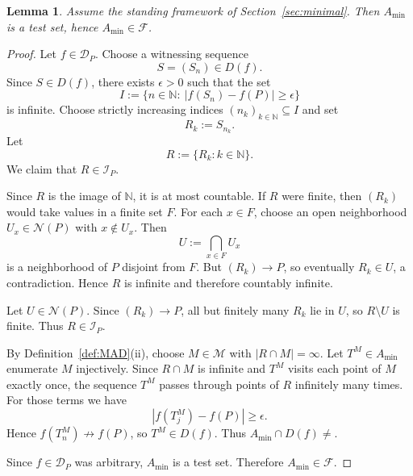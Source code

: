 \documentclass[10pt,a4paper]{amsart}
\newtheorem{lemma}{Lemma}
\newcommand{\Dp}{\mathcal{D}_P}
\newcommand{\F}{\mathcal{F}}
\newcommand{\N}{\mathbb{N}}
\newcommand{\e}{\epsilon}
\def\emptyset{}%
\begin{document}
\begin{lemma}\label{lem:Amin_is_testset}
Assume the standing framework of Section~\ref{sec:minimal}.
Then $A_{\min}$ is a test set, hence $A_{\min}\in\F$.
\end{lemma}

\begin{proof}
Let $f\in\Dp$.
Choose a witnessing sequence
\[
S=(S_n)\in D(f).
\]
Since $S\in D(f)$, there exists $\e>0$ such that the set
\[
I:=\{n\in\N:\ |f(S_n)-f(P)|\ge\e\}
\]
is infinite.
Choose strictly increasing indices $(n_k)_{k\in\N}\subseteq I$ and set
\[
R_k:=S_{n_k}.
\]
Let
\[
R:=\{R_k:k\in\N\}.
\]
We claim that $R\in\mathcal I_P$.

Since $R$ is the image of $\N$, it is at most countable.
If $R$ were finite, then $(R_k)$ would take values in a finite set $F$.
For each $x\in F$, choose an open neighborhood $U_x\in\mathcal N(P)$ with $x\notin U_x$.
Then
\[
U:=\bigcap_{x\in F}U_x
\]
is a neighborhood of $P$ disjoint from $F$.
But $(R_k)\to P$, so eventually $R_k\in U$, a contradiction.
Hence $R$ is infinite and therefore countably infinite.

Let $U\in\mathcal N(P)$.
Since $(R_k)\to P$, all but finitely many $R_k$ lie in $U$, so $R\setminus U$ is finite.
Thus $R\in\mathcal I_P$.

By Definition~\ref{def:MAD}(ii), choose $M\in\mathcal M$ with $|R\cap M|=\infty$.
Let $T^M\in A_{\min}$ enumerate $M$ injectively.
Since $R\cap M$ is infinite and $T^M$ visits each point of $M$ exactly once, the sequence $T^M$ passes through points of $R$ infinitely many times.
For those terms we have
\[
|f(T^M_j)-f(P)|\ge \e.
\]
Hence $f(T^M_n)\not\to f(P)$, so $T^M\in D(f)$.
Thus $A_{\min}\cap D(f)\neq\emptyset$.

Since $f\in\Dp$ was arbitrary, $A_{\min}$ is a test set.
Therefore $A_{\min}\in\F$.
\end{proof}
\end{document}
